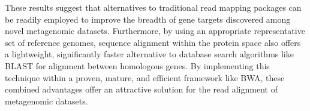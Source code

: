These results suggest that alternatives to traditional read mapping packages can be readily employed to improve the breadth of gene targets discovered among novel metagenomic datasets. Furthermore, by using an appropriate representative set of reference genomes, sequence alignment within the protein space also offers a lightweight, significantly faster alternative to database search algorithms like BLAST for alignment between homologous genes.  By implementing this technique within a proven, mature, and efficient framework like BWA, these combined advantages offer an attractive solution for the read alignment of metagenomic datasets.

  
  
  